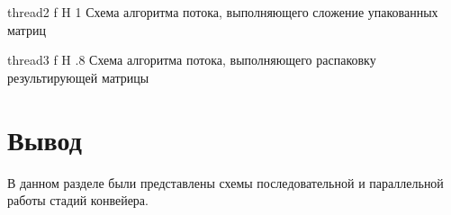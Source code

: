 {thread2}
{f}
{H}
{1\textwidth}
{Схема алгоритма потока, выполняющего сложение упакованных матриц}

{thread3}
{f}
{H}
{.8\textwidth}
{Схема алгоритма потока, выполняющего распаковку результирующей матрицы}

\section*{Вывод}
В данном разделе были представлены схемы последовательной и параллельной работы стадий конвейера.
